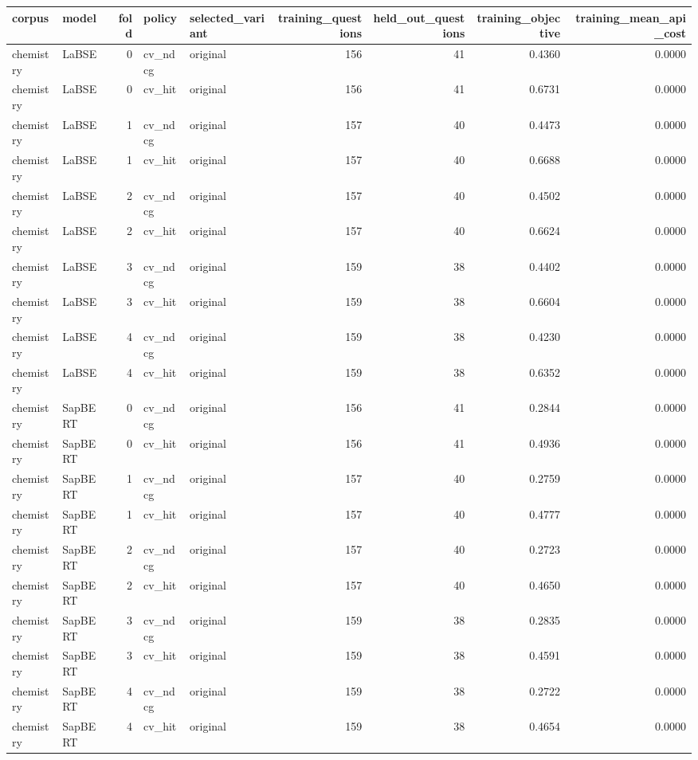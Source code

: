 \begin{tabular}{llrllrrrr}
\toprule
corpus & model & fold & policy & selected\_variant & training\_questions & held\_out\_questions & training\_objective & training\_mean\_api\_cost \\
\midrule
chemistry & LaBSE & 0 & cv\_ndcg & original & 156 & 41 & 0.4360 & 0.0000 \\
chemistry & LaBSE & 0 & cv\_hit & original & 156 & 41 & 0.6731 & 0.0000 \\
chemistry & LaBSE & 1 & cv\_ndcg & original & 157 & 40 & 0.4473 & 0.0000 \\
chemistry & LaBSE & 1 & cv\_hit & original & 157 & 40 & 0.6688 & 0.0000 \\
chemistry & LaBSE & 2 & cv\_ndcg & original & 157 & 40 & 0.4502 & 0.0000 \\
chemistry & LaBSE & 2 & cv\_hit & original & 157 & 40 & 0.6624 & 0.0000 \\
chemistry & LaBSE & 3 & cv\_ndcg & original & 159 & 38 & 0.4402 & 0.0000 \\
chemistry & LaBSE & 3 & cv\_hit & original & 159 & 38 & 0.6604 & 0.0000 \\
chemistry & LaBSE & 4 & cv\_ndcg & original & 159 & 38 & 0.4230 & 0.0000 \\
chemistry & LaBSE & 4 & cv\_hit & original & 159 & 38 & 0.6352 & 0.0000 \\
chemistry & SapBERT & 0 & cv\_ndcg & original & 156 & 41 & 0.2844 & 0.0000 \\
chemistry & SapBERT & 0 & cv\_hit & original & 156 & 41 & 0.4936 & 0.0000 \\
chemistry & SapBERT & 1 & cv\_ndcg & original & 157 & 40 & 0.2759 & 0.0000 \\
chemistry & SapBERT & 1 & cv\_hit & original & 157 & 40 & 0.4777 & 0.0000 \\
chemistry & SapBERT & 2 & cv\_ndcg & original & 157 & 40 & 0.2723 & 0.0000 \\
chemistry & SapBERT & 2 & cv\_hit & original & 157 & 40 & 0.4650 & 0.0000 \\
chemistry & SapBERT & 3 & cv\_ndcg & original & 159 & 38 & 0.2835 & 0.0000 \\
chemistry & SapBERT & 3 & cv\_hit & original & 159 & 38 & 0.4591 & 0.0000 \\
chemistry & SapBERT & 4 & cv\_ndcg & original & 159 & 38 & 0.2722 & 0.0000 \\
chemistry & SapBERT & 4 & cv\_hit & original & 159 & 38 & 0.4654 & 0.0000 \\

\end{tabular}
